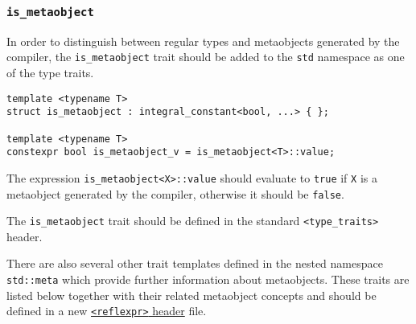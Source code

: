 \subsubsection{\texttt{is\_metaobject}}

In order to distinguish between regular types and metaobjects generated
by the compiler, the \texttt{is\_metaobject} trait should be added
to the \texttt{std} namespace as one of the type traits. 

\begin{verbatim}
template <typename T>
struct is_metaobject : integral_constant<bool, ...> { };

template <typename T>
constexpr bool is_metaobject_v = is_metaobject<T>::value;
\end{verbatim}

The expression \texttt{is\_metaobject<X>::value} should evaluate to \texttt{true}
if \texttt{X} is a metaobject generated by the compiler, otherwise it should
be \texttt{false}.

The \texttt{is\_metaobject} trait should be defined in the standard
\texttt{<type\_traits>} header.

There are also several other trait templates defined in the nested namespace
\texttt{std::meta} which provide further information about metaobjects.
These traits are listed below together with their related metaobject concepts
and should be defined in a new
\hyperref[section-reflexpr-header]{\texttt{<reflexpr>} header} file.
